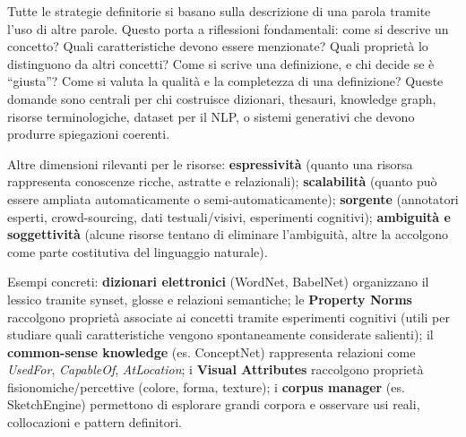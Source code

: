 \documentclass[12pt,a4paper]{article}
\begin{document}
Tutte le strategie definitorie si basano sulla descrizione di una parola tramite l'uso di altre parole. Questo porta a riflessioni fondamentali: come si descrive un concetto? Quali caratteristiche devono essere menzionate? Quali propriet\`a lo distinguono da altri concetti? Come si scrive una definizione, e chi decide se \`e ``giusta''? Come si valuta la qualit\`a e la completezza di una definizione? Queste domande sono centrali per chi costruisce dizionari, thesauri, knowledge graph, risorse terminologiche, dataset per il NLP, o sistemi generativi che devono produrre spiegazioni coerenti.

Altre dimensioni rilevanti per le risorse: \textbf{espressivit\`a} (quanto una risorsa rappresenta conoscenze ricche, astratte e relazionali); \textbf{scalabilit\`a} (quanto pu\`o essere ampliata automaticamente o semi-automaticamente); \textbf{sorgente} (annotatori esperti, crowd-sourcing, dati testuali/visivi, esperimenti cognitivi); \textbf{ambiguit\`a e soggettivit\`a} (alcune risorse tentano di eliminare l'ambiguit\`a, altre la accolgono come parte costitutiva del linguaggio naturale).

\begin{resultbox}
\begin{center}
\end{center}
\end{resultbox}

Esempi concreti: \textbf{dizionari elettronici} (WordNet, BabelNet) organizzano il lessico tramite synset, glosse e relazioni semantiche; le \textbf{Property Norms} raccolgono propriet\`a associate ai concetti tramite esperimenti cognitivi (utili per studiare quali caratteristiche vengono spontaneamente considerate salienti); il \textbf{common-sense knowledge} (es. ConceptNet) rappresenta relazioni come \textit{UsedFor}, \textit{CapableOf}, \textit{AtLocation}; i \textbf{Visual Attributes} raccolgono propriet\`a fisionomiche/percettive (colore, forma, texture); i \textbf{corpus manager} (es. SketchEngine) permettono di esplorare grandi corpora e osservare usi reali, collocazioni e pattern definitori.
\end{document}
